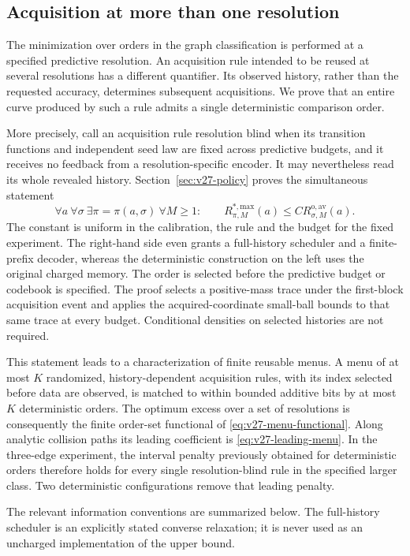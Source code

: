\subsection{Acquisition at more than one resolution}
The minimization over orders in the graph classification is performed at a specified predictive resolution. An acquisition rule intended to be reused at several resolutions has a different quantifier. Its observed history, rather than the requested accuracy, determines subsequent acquisitions. We prove that an entire curve produced by such a rule admits a single deterministic comparison order.

More precisely, call an acquisition rule resolution blind when its transition functions and independent seed law are fixed across predictive budgets, and it receives no feedback from a resolution-specific encoder. It may nevertheless read its whole revealed history. Section~\ref{sec:v27-policy} proves the simultaneous statement
\[
 \forall a\ \forall\sigma\ \exists\pi=\pi(a,\sigma)\ \forall M\ge1:
 \qquad R^{*,\mathrm{max}}_{\pi,M}(a)
                      \le C R^{\mathrm{o,av}}_{\sigma,M}(a).
\]
The constant is uniform in the calibration, the rule and the budget for the fixed experiment. The right-hand side even grants a full-history scheduler and a finite-prefix decoder, whereas the deterministic construction on the left uses the original charged memory. The order is selected before the predictive budget or codebook is specified. The proof selects a positive-mass trace under the first-block acquisition event and applies the acquired-coordinate small-ball bounds to that same trace at every budget. Conditional densities on selected histories are not required.

This statement leads to a characterization of finite reusable menus. A menu of at most $K$ randomized, history-dependent acquisition rules, with its index selected before data are observed, is matched to within bounded additive bits by at most $K$ deterministic orders. The optimum excess over a set of resolutions is consequently the finite order-set functional of \eqref{eq:v27-menu-functional}. Along analytic collision paths its leading coefficient is \eqref{eq:v27-leading-menu}. In the three-edge experiment, the interval penalty previously obtained for deterministic orders therefore holds for every single resolution-blind rule in the specified larger class. Two deterministic configurations remove that leading penalty.

The relevant information conventions are summarized below. The full-history scheduler is an explicitly stated converse relaxation; it is never used as an uncharged implementation of the upper bound.

